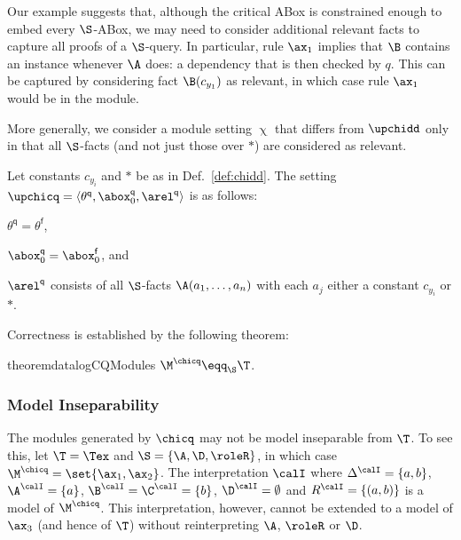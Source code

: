 Our example suggests that, although the critical ABox
is constrained enough to embed every $\S$-ABox,  we may need
to consider additional relevant facts to capture all
proofs of a $\S$-query. 
In particular, rule $\ax_1$ implies that $\B$ contains an 
instance
whenever $\A$ does: a dependency that is then checked by $q$.
This can be captured by considering fact $\B(c_{y_1})$
as relevant, in which case rule $\ax_1$ would be in the module.

More generally, we consider a module setting $\upchi$ 
that differs from $\upchidd$
only in that all $\S$-facts (and not just those over 
$\ast$) are considered
as relevant. 
%
\begin{definition} \label{def:chicq} %
  Let constants $c_{y_i}$ and $\ast$ be as in Def.~\ref{def:chidd}. 
  The setting $\upchicq=\langle \theta^{\mathsf{q}}, \abox_0^{\mathsf{q}}, \arel^{\mathsf{q}} \rangle$ is 
  as follows:
  \begin{inparaenum}[\it (i)]
  \item $\theta^{\mathsf{q}}= \theta^{\mathsf{f}}$,
  \item $\abox_0^{\mathsf{q}} = \abox_0^{\mathsf{f}}$, and 
  \item $\arel^{\mathsf{q}}$ consists of all $\S$-facts $\A(a_1, \ldots, a_n)$
  with each $a_j$ either a constant $c_{y_i}$ or $\ast$.\qedhere
  \end{inparaenum}
\end{definition}
%
Correctness is established by the following theorem:


\begin{restatable}{theorem}{datalogCQModules} \label{thm:datalogCQModules}
  $\M^{\chicq}\eqq_{\S}\T$.
\end{restatable}
 
\subsubsection{Model Inseparability}
\label{sec:semantic-modules}

The modules generated by $\chicq$ may not be model inseparable from
$\T$. To see this, let $\T=\Tex$ and $\S = \{\A,\D,\roleR\}$, in which case
$\M^{\chicq}=\set{\ax_1,\ax_2}$. The interpretation 
$\calI$ where 
$\Delta^{\calI} = \{a,b\}$, $\A^{\calI} = \{a\}$,
$\B^{\calI} = \C^{\calI} = \{b\}$, $\D^{\calI} = \emptyset$
and $R^{\calI} = \{ (a,b)\}$ is a model of
$\M^{\chicq}$. This interpretation, however, 
cannot be extended to a model of $\ax_3$ (and hence of $\T$) without reinterpreting
$\A$, $\roleR$ or $\D$. 

